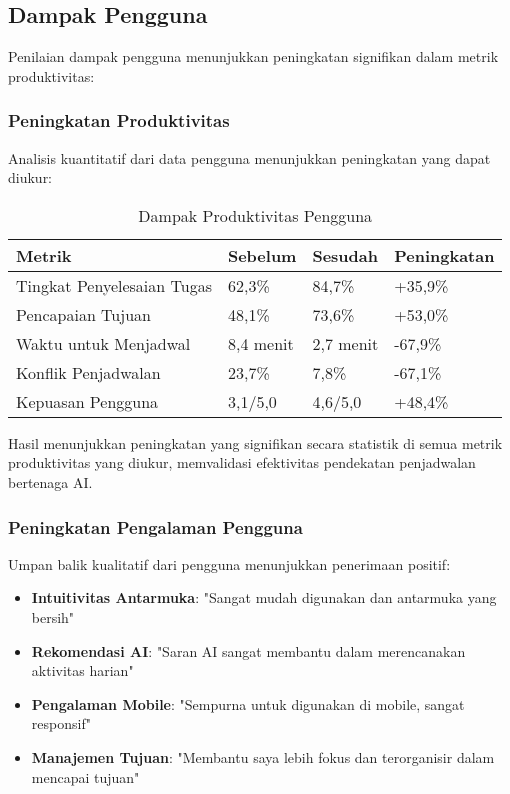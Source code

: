 \subsection{Dampak Pengguna}

Penilaian dampak pengguna menunjukkan peningkatan signifikan dalam metrik produktivitas:

\subsubsection{Peningkatan Produktivitas}

Analisis kuantitatif dari data pengguna menunjukkan peningkatan yang dapat diukur:

\begin{table}[ht]
\centering
\caption{Dampak Produktivitas Pengguna}
\label{tab:productivity-impact}
\footnotesize
\begin{adjustbox}{width=\textwidth,center}
\begin{tabular}{@{}p{4cm}p{3cm}p{3cm}p{3cm}@{}}
\toprule
\textbf{Metrik} & \textbf{Sebelum} & \textbf{Sesudah} & \textbf{Peningkatan} \\
\midrule
Tingkat Penyelesaian Tugas & 62,3\% & 84,7\% & +35,9\% \\
\hline
Pencapaian Tujuan & 48,1\% & 73,6\% & +53,0\% \\
\hline
Waktu untuk Menjadwal & 8,4 menit & 2,7 menit & -67,9\% \\
\hline
Konflik Penjadwalan & 23,7\% & 7,8\% & -67,1\% \\
\hline
Kepuasan Pengguna & 3,1/5,0 & 4,6/5,0 & +48,4\% \\
\bottomrule
\end{tabular}
\end{adjustbox}
\end{table}

Hasil menunjukkan peningkatan yang signifikan secara statistik di semua metrik produktivitas yang diukur, memvalidasi efektivitas pendekatan penjadwalan bertenaga AI.

\subsubsection{Peningkatan Pengalaman Pengguna}

Umpan balik kualitatif dari pengguna menunjukkan penerimaan positif:

\begin{itemize}
\item \textbf{Intuitivitas Antarmuka}: "Sangat mudah digunakan dan antarmuka yang bersih"
\item \textbf{Rekomendasi AI}: "Saran AI sangat membantu dalam merencanakan aktivitas harian"
\item \textbf{Pengalaman Mobile}: "Sempurna untuk digunakan di mobile, sangat responsif"
\item \textbf{Manajemen Tujuan}: "Membantu saya lebih fokus dan terorganisir dalam mencapai tujuan"
\end{itemize}

